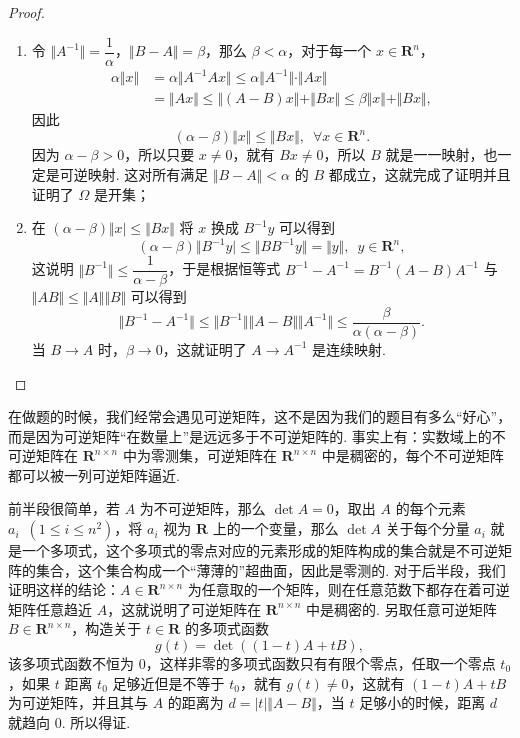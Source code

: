 \begin{proof}
    \begin{enumerate}
        \item 令 $\Vert A^{-1}\Vert = \dfrac{1}{\alpha}$，$\Vert B-A\Vert = \beta$，那么 $\beta < \alpha$，对于每一个 $x\in \mathbf{R}^n$，
              \begin{align}
                  \alpha\Vert x\Vert & = \alpha\Vert A^{-1}Ax\Vert \leqslant \alpha \Vert A^{-1}\Vert \cdot \Vert Ax \Vert                        \\
                                     & = \Vert Ax\Vert \leqslant \Vert (A - B)x\Vert + \Vert Bx\Vert \leqslant \beta\Vert x\Vert + \Vert Bx\Vert,
              \end{align}
              因此 \[(\alpha - \beta)\Vert x\Vert \leqslant \Vert Bx\Vert,\enspace \forall x\in \mathbf{R}^n.\]
              因为 $\alpha - \beta > 0$，所以只要 $x\neq 0$，就有 $Bx\neq 0$，所以 $B$ 就是一一映射，也一定是可逆映射. 这对所有满足 $\Vert B - A\Vert < \alpha$ 的 $B$ 都成立，这就完成了证明并且证明了 $\Omega$ 是开集；
        \item 在 $(\alpha - \beta)\Vert x\vert \leqslant \Vert Bx\Vert$ 将 $x$ 换成 $B^{-1}y$ 可以得到 \[(\alpha - \beta)\Vert B^{-1}y\vert \leqslant \Vert BB^{-1}y\Vert = \Vert y\Vert,\enspace y\in \mathbf{R}^n,\]
              这说明 $\Vert B^{-1}\Vert \leqslant \dfrac{1}{\alpha - \beta}$，于是根据恒等式 $B^{-1} - A^{-1} = B^{-1}(A - B)A^{-1}$ 与 $\Vert AB\Vert \leqslant \Vert A\Vert \Vert B\Vert$ 可以得到 \[\Vert B^{-1} - A^{-1}\Vert \leqslant \Vert B^{-1}\Vert\Vert A - B\Vert\Vert A^{-1}\Vert \leqslant \dfrac{\beta}{\alpha(\alpha - \beta)}.\]
              当 $B\to A$ 时，$\beta\to 0$，这就证明了 $A\to A^{-1}$ 是连续映射.
    \end{enumerate}
\end{proof}

在做题的时候，我们经常会遇见可逆矩阵，这不是因为我们的题目有多么``好心''，而是因为可逆矩阵``在数量上''是远远多于不可逆矩阵的. 事实上有：实数域上的不可逆矩阵在 $\mathbf{R}^{n\times n}$ 中为零测集，可逆矩阵在 $\mathbf{R}^{n\times n}$ 中是稠密的，每个不可逆矩阵都可以被一列可逆矩阵逼近.

前半段很简单，若 $A$ 为不可逆矩阵，那么 $\det A = 0$，取出 $A$ 的每个元素 $a_i \enspace(1\leqslant i\leqslant n^2)$，将 $a_i$ 视为 $\mathbf{R}$ 上的一个变量，那么 $\det A$ 关于每个分量 $a_i$ 就是一个多项式，这个多项式的零点对应的元素形成的矩阵构成的集合就是不可逆矩阵的集合，这个集合构成一个``薄薄的''超曲面，因此是零测的.
对于后半段，我们证明这样的结论：$A\in\mathbf{R}^{n\times n}$ 为任意取的一个矩阵，则在任意范数下都存在着可逆矩阵任意趋近 $A$，这就说明了可逆矩阵在 $\mathbf{R}^{n\times n}$ 中是稠密的. 另取任意可逆矩阵 $B\in\mathbf{R}^{n\times n}$，构造关于 $t\in \mathbf{R}$ 的多项式函数 \[g(t) = \det((1 - t)A + tB),\]
该多项式函数不恒为 $0$，这样非零的多项式函数只有有限个零点，任取一个零点 $t_0$，如果 $t$ 距离 $t_0$ 足够近但是不等于 $t_0$，就有 $g(t) \neq0$，这就有 $(1 - t)A + tB$ 为可逆矩阵，并且其与 $A$ 的距离为 $d = \vert t\vert \Vert A - B\Vert$，当 $t$ 足够小的时候，距离 $d$ 就趋向 $0$. 所以得证.

